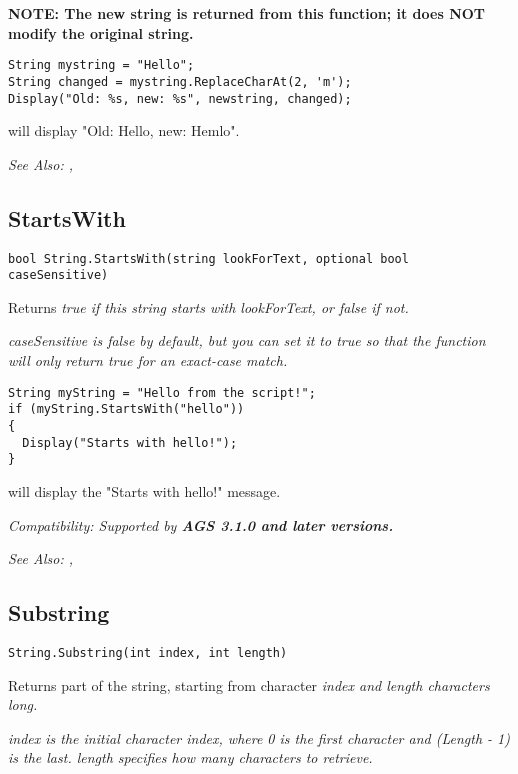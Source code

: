 \bf{NOTE:} The new string is returned from this function; it
does \bf{NOT} modify the original string.

\begin{verbatim}
String mystring = "Hello";
String changed = mystring.ReplaceCharAt(2, 'm');
Display("Old: %s, new: %s", newstring, changed);
\end{verbatim}
will display "Old: Hello, new: Hemlo".

\it{See Also:} ,


\subsection{StartsWith}\label{String.StartsWith}%

\begin{verbatim}
bool String.StartsWith(string lookForText, optional bool caseSensitive)
\end{verbatim}
Returns \it{true} if this string starts with \it{lookForText}, or \it{false} if not.

\it{caseSensitive} is \it{false} by default, but you can set it to true so that the
function will only return \it{true} for an exact-case match.

\begin{verbatim}
String myString = "Hello from the script!";
if (myString.StartsWith("hello"))
{
  Display("Starts with hello!");
}
\end{verbatim}
will display the "Starts with hello!" message.

\it{Compatibility:} Supported by \bf{AGS 3.1.0} and later versions.

\it{See Also:} ,


\subsection{Substring}\label{String.Substring}%

\begin{verbatim}
String.Substring(int index, int length)
\end{verbatim}
Returns part of the string, starting from character \it{index} and \it{length}
characters long.

\it{index} is the initial character index, where 0 is the first character and
(Length - 1) is the last. \it{length} specifies how many characters to retrieve.

